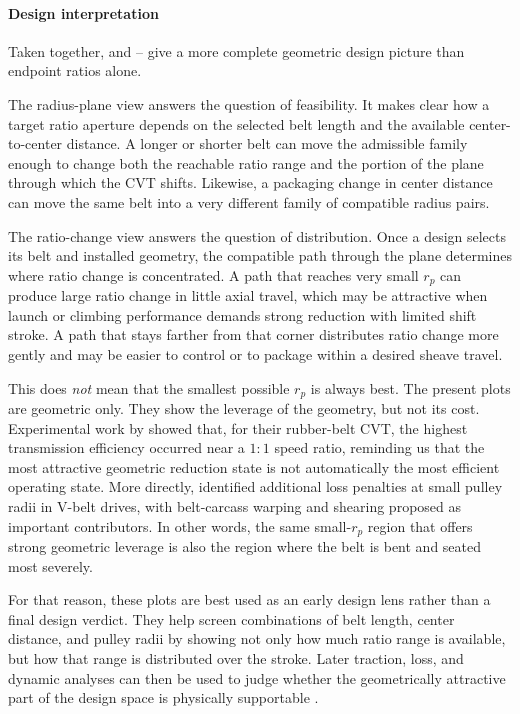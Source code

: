 \documentclass[11pt]{report}
\begin{document}
\paragraph{Design interpretation}

Taken together,  and
-- give a more
complete geometric design picture than endpoint ratios alone.

The radius-plane view answers the question of feasibility. It makes clear how a
target ratio aperture depends on the selected belt length and the available
center-to-center distance. A longer or shorter belt can move the admissible
family enough to change both the reachable ratio range and the portion of the
plane through which the CVT shifts. Likewise, a packaging change in center
distance can move the same belt into a very different family of compatible
radius pairs.

The ratio-change view answers the question of distribution. Once a design
selects its belt and installed geometry, the compatible path through the plane
determines where ratio change is concentrated. A path that reaches very small
\(r_p\) can produce large ratio change in little axial travel, which may be
attractive when launch or climbing performance demands strong reduction with
limited shift stroke. A path that stays farther from that corner distributes
ratio change more gently and may be easier to control or to package within a
desired sheave travel.

This does \emph{not} mean that the smallest possible \(r_p\) is always best.
The present plots are geometric only. They show the leverage of the geometry,
but not its cost. Experimental work by \citet{ChenLeeSung1998} showed that, for
their rubber-belt CVT, the highest transmission efficiency occurred near a
\(1{:}1\) speed ratio, reminding us that the most attractive geometric reduction
state is not automatically the most efficient operating state. More directly,
\citet{ChildsCowburn1987b} identified additional loss penalties at small pulley
radii in V-belt drives, with belt-carcass warping and shearing proposed as
important contributors. In other words, the same small-\(r_p\) region that
offers strong geometric leverage is also the region where the belt is bent and
seated most severely.

For that reason, these plots are best used as an early design lens rather than
a final design verdict. They help screen combinations of belt length, center
distance, and pulley radii by showing not only how much ratio range is
available, but how that range is distributed over the stroke. Later traction,
loss, and dynamic analyses can then be used to judge whether the geometrically
attractive part of the design space is physically supportable
\citep{Gerbert1996,Bertini2014,Messick2018}.
\end{document}
